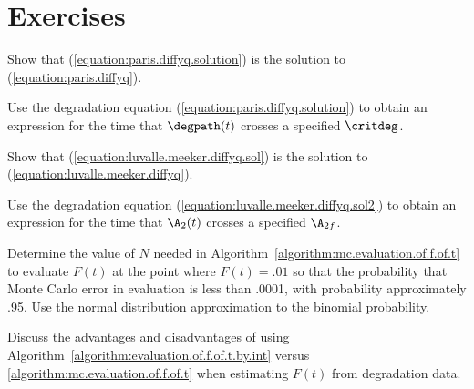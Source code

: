 \section*{Exercises}

\begin{exercise}
Show that (\ref{equation:paris.diffyq.solution}) 
is the solution to (\ref{equation:paris.diffyq}).
\end{exercise}

\begin{exercise}
Use the degradation equation (\ref{equation:paris.diffyq.solution}) 
to obtain an expression for the time that $\degpath(t)$
crosses a specified $\critdeg$.
\end{exercise}

\begin{exercise}
Show that (\ref{equation:luvalle.meeker.diffyq.sol}) 
is the solution to (\ref{equation:luvalle.meeker.diffyq}).
\end{exercise}

\begin{exercise}
Use  the degradation equation (\ref{equation:luvalle.meeker.diffyq.sol2}) 
to obtain an expression for the time that $\A_{2}(t)$
crosses a specified $\A_{2f}$.
\end{exercise}

\begin{exercise}
Determine the value of $N$ needed in
Algorithm~\ref{algorithm:mc.evaluation.of.f.of.t} to evaluate $F(t)$ at
the point where $F(t)=.01$ so that the probability that Monte Carlo
error in evaluation is less than .0001, with probability approximately
.95.  Use the normal distribution approximation to the binomial
probability.
\end{exercise}

\begin{exercise}
Discuss the advantages and disadvantages of
using Algorithm~\ref{algorithm:evaluation.of.f.of.t.by.int} 
versus \ref{algorithm:mc.evaluation.of.f.of.t} when estimating $F(t)$
from degradation data.
\end{exercise}

